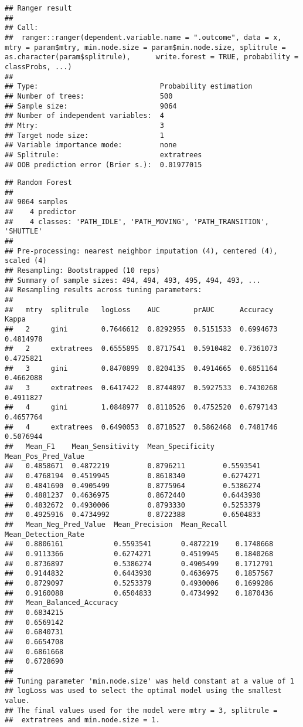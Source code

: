 \documentclass[]{article}
\begin{document}
\begin{verbatim}
## Ranger result
## 
## Call:
##  ranger::ranger(dependent.variable.name = ".outcome", data = x,      mtry = param$mtry, min.node.size = param$min.node.size, splitrule = as.character(param$splitrule),      write.forest = TRUE, probability = classProbs, ...) 
## 
## Type:                             Probability estimation 
## Number of trees:                  500 
## Sample size:                      9064 
## Number of independent variables:  4 
## Mtry:                             3 
## Target node size:                 1 
## Variable importance mode:         none 
## Splitrule:                        extratrees 
## OOB prediction error (Brier s.):  0.01977015
\end{verbatim}

\begin{verbatim}
## Random Forest 
## 
## 9064 samples
##    4 predictor
##    4 classes: 'PATH_IDLE', 'PATH_MOVING', 'PATH_TRANSITION', 'SHUTTLE' 
## 
## Pre-processing: nearest neighbor imputation (4), centered (4), scaled (4) 
## Resampling: Bootstrapped (10 reps) 
## Summary of sample sizes: 494, 494, 493, 495, 494, 493, ... 
## Resampling results across tuning parameters:
## 
##   mtry  splitrule   logLoss    AUC        prAUC      Accuracy   Kappa    
##   2     gini        0.7646612  0.8292955  0.5151533  0.6994673  0.4814978
##   2     extratrees  0.6555895  0.8717541  0.5910482  0.7361073  0.4725821
##   3     gini        0.8470899  0.8204135  0.4914665  0.6851164  0.4662088
##   3     extratrees  0.6417422  0.8744897  0.5927533  0.7430268  0.4911827
##   4     gini        1.0848977  0.8110526  0.4752520  0.6797143  0.4657764
##   4     extratrees  0.6490053  0.8718527  0.5862468  0.7481746  0.5076944
##   Mean_F1    Mean_Sensitivity  Mean_Specificity  Mean_Pos_Pred_Value
##   0.4858671  0.4872219         0.8796211         0.5593541          
##   0.4768194  0.4519945         0.8618340         0.6274271          
##   0.4841690  0.4905499         0.8775964         0.5386274          
##   0.4881237  0.4636975         0.8672440         0.6443930          
##   0.4832672  0.4930006         0.8793330         0.5253379          
##   0.4925916  0.4734992         0.8722388         0.6504833          
##   Mean_Neg_Pred_Value  Mean_Precision  Mean_Recall  Mean_Detection_Rate
##   0.8806161            0.5593541       0.4872219    0.1748668          
##   0.9113366            0.6274271       0.4519945    0.1840268          
##   0.8736897            0.5386274       0.4905499    0.1712791          
##   0.9144832            0.6443930       0.4636975    0.1857567          
##   0.8729097            0.5253379       0.4930006    0.1699286          
##   0.9160088            0.6504833       0.4734992    0.1870436          
##   Mean_Balanced_Accuracy
##   0.6834215             
##   0.6569142             
##   0.6840731             
##   0.6654708             
##   0.6861668             
##   0.6728690             
## 
## Tuning parameter 'min.node.size' was held constant at a value of 1
## logLoss was used to select the optimal model using the smallest value.
## The final values used for the model were mtry = 3, splitrule =
##  extratrees and min.node.size = 1.
\end{verbatim}
\end{document}

